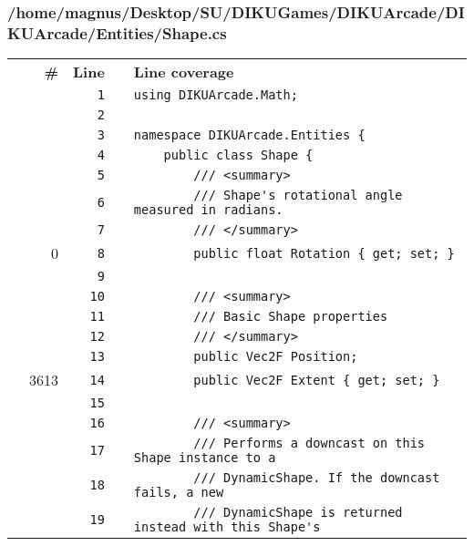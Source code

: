 \documentclass[a4paper,landscape,10pt]{article}
\begin{document}
\subsubsection{/home/magnus/Desktop/SU/DIKUGames/DIKUArcade/DIKUArcade/Entities/Shape.cs}
\begin{longtable}[l]{lrrll}
\textbf{} & \textbf{\#} & \textbf{Line} & \textbf{} & \textbf{Line coverage}\\
\cellcolor{gray} &  & \verb~1~ & & \verb~using DIKUArcade.Math;~\\
\cellcolor{gray} &  & \verb~2~ & & \verb~~\\
\cellcolor{gray} &  & \verb~3~ & & \verb~namespace DIKUArcade.Entities {~\\
\cellcolor{gray} &  & \verb~4~ & & \verb~    public class Shape {~\\
\cellcolor{gray} &  & \verb~5~ & & \verb~        /// <summary>~\\
\cellcolor{gray} &  & \verb~6~ & & \verb~        /// Shape's rotational angle measured in radians.~\\
\cellcolor{gray} &  & \verb~7~ & & \verb~        /// </summary>~\\
\cellcolor{red} & 0 & \verb~8~ & & \verb~        public float Rotation { get; set; }~\\
\cellcolor{gray} &  & \verb~9~ & & \verb~~\\
\cellcolor{gray} &  & \verb~10~ & & \verb~        /// <summary>~\\
\cellcolor{gray} &  & \verb~11~ & & \verb~        /// Basic Shape properties~\\
\cellcolor{gray} &  & \verb~12~ & & \verb~        /// </summary>~\\
\cellcolor{gray} &  & \verb~13~ & & \verb~        public Vec2F Position;~\\
\cellcolor{green} & 3613 & \verb~14~ & & \verb~        public Vec2F Extent { get; set; }~\\
\cellcolor{gray} &  & \verb~15~ & & \verb~~\\
\cellcolor{gray} &  & \verb~16~ & & \verb~        /// <summary>~\\
\cellcolor{gray} &  & \verb~17~ & & \verb~        /// Performs a downcast on this Shape instance to a~\\
\cellcolor{gray} &  & \verb~18~ & & \verb~        /// DynamicShape. If the downcast fails, a new~\\
\cellcolor{gray} &  & \verb~19~ & & \verb~        /// DynamicShape is returned instead with this Shape's~\\

\end{longtable}
\end{document}
